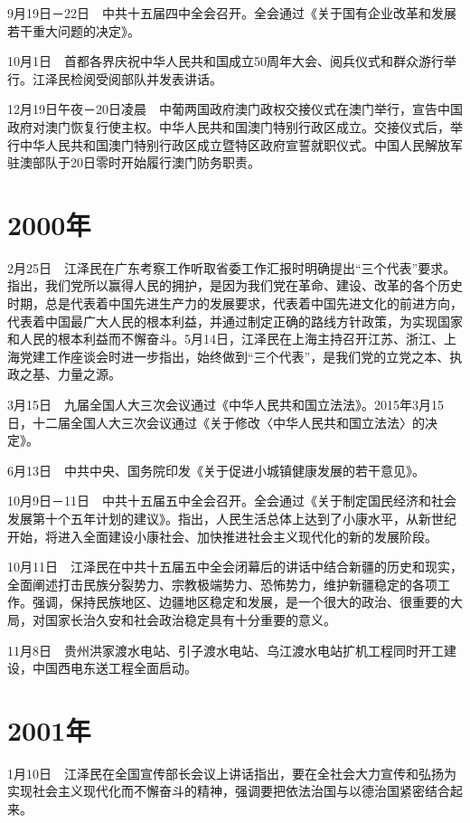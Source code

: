 \documentclass[10pt,a4paper,twocolumn]{book}
\begin{document}
9月19日－22日　中共十五届四中全会召开。全会通过《关于国有企业改革和发展若干重大问题的决定》。

10月1日　首都各界庆祝中华人民共和国成立50周年大会、阅兵仪式和群众游行举行。江泽民检阅受阅部队并发表讲话。

12月19日午夜－20日凌晨　中葡两国政府澳门政权交接仪式在澳门举行，宣告中国政府对澳门恢复行使主权。中华人民共和国澳门特别行政区成立。交接仪式后，举行中华人民共和国澳门特别行政区成立暨特区政府宣誓就职仪式。中国人民解放军驻澳部队于20日零时开始履行澳门防务职责。

\section{2000年}

2月25日　江泽民在广东考察工作听取省委工作汇报时明确提出“三个代表”要求。指出，我们党所以赢得人民的拥护，是因为我们党在革命、建设、改革的各个历史时期，总是代表着中国先进生产力的发展要求，代表着中国先进文化的前进方向，代表着中国最广大人民的根本利益，并通过制定正确的路线方针政策，为实现国家和人民的根本利益而不懈奋斗。5月14日，江泽民在上海主持召开江苏、浙江、上海党建工作座谈会时进一步指出，始终做到“三个代表”，是我们党的立党之本、执政之基、力量之源。

3月15日　九届全国人大三次会议通过《中华人民共和国立法法》。2015年3月15日，十二届全国人大三次会议通过《关于修改〈中华人民共和国立法法〉的决定》。

6月13日　中共中央、国务院印发《关于促进小城镇健康发展的若干意见》。

10月9日－11日　中共十五届五中全会召开。全会通过《关于制定国民经济和社会发展第十个五年计划的建议》。指出，人民生活总体上达到了小康水平，从新世纪开始，将进入全面建设小康社会、加快推进社会主义现代化的新的发展阶段。

10月11日　江泽民在中共十五届五中全会闭幕后的讲话中结合新疆的历史和现实，全面阐述打击民族分裂势力、宗教极端势力、恐怖势力，维护新疆稳定的各项工作。强调，保持民族地区、边疆地区稳定和发展，是一个很大的政治、很重要的大局，对国家长治久安和社会政治稳定具有十分重要的意义。

11月8日　贵州洪家渡水电站、引子渡水电站、乌江渡水电站扩机工程同时开工建设，中国西电东送工程全面启动。

\section{2001年}

1月10日　江泽民在全国宣传部长会议上讲话指出，要在全社会大力宣传和弘扬为实现社会主义现代化而不懈奋斗的精神，强调要把依法治国与以德治国紧密结合起来。
\end{document}
